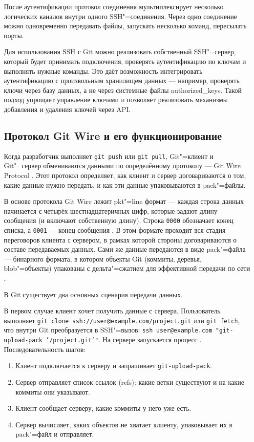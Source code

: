 \documentclass[coursework]{SCWorks}
\begin{document}
После аутентификации протокол соединения мультиплексирует несколько логических каналов внутри одного SSH"=соединения. Через одно соединение можно одновременно передавать файлы, запускать несколько команд, пересылать порты.

Для использования SSH с Git можно реализовать собственный SSH"=сервер, который будет принимать подключения, проверять аутентификацию по ключам и выполнять нужные команды. Это даёт возможность интегрировать аутентификацию с произвольным хранилищем данных --- например, проверять ключи через базу данных, а не через системные файлы authorized\_keys. Такой подход упрощает управление ключами и позволяет реализовать механизмы добавления и удаления ключей через API.

\subsection{Протокол Git Wire и его функционирование}
\label{sec:gitwire}

Когда разработчик выполняет \texttt{git push} или \texttt{git pull}, Git"=клиент и Git"=сервер обмениваются данными по определённому протоколу --- Git Wire Protocol \cite{gitprotocolpack}. Этот протокол определяет, как клиент и сервер договариваются о том, какие данные нужно передать, и как эти данные упаковываются в pack"=файлы.

В основе протокола Git Wire лежит pkt"=line формат --- каждая строка данных начинается с четырёх шестнадцатеричных цифр, которые задают длину сообщения (и включают собственную длину). Строка \texttt{0000} обозначает конец списка, а \texttt{0001} --- конец сообщения \cite{gitprotocolpack}. В этом формате проходит вся стадия переговоров клиента с сервером, в рамках которой стороны договариваются о составе передаваемых данных. Сами же данные передаются в виде pack"=файла --- бинарного формата, в котором объекты Git (коммиты, деревья, blob"=объекты) упакованы с дельта"=сжатием для эффективной передачи по сети \cite{gitprotocolpack}.

В Git существует два основных сценария передачи данных.

В первом случае клиент хочет получить данные с сервера. Пользователь выполняет \texttt{git clone ssh://user@example.com/project.git} или \texttt{git fetch}, что внутри Git преобразуется в SSH"=вызов: \texttt{ssh user@example.com "git-upload-pack '/project.git'"}. На сервере запускается процесс  \cite{gitprotocolpack}. Последовательность шагов:
\begin{enumerate}
	\item Клиент подключается к серверу и запрашивает \texttt{git-upload-pack}.
	\item Сервер отправляет список ссылок (refs): какие ветки существуют и на какие коммиты они указывают.
	\item Клиент сообщает серверу, какие коммиты у него уже есть.
	\item Сервер вычисляет, каких объектов не хватает клиенту, упаковывает их в pack"=файл и отправляет.
\end{enumerate}
\end{document}
